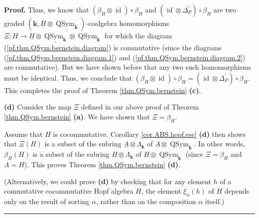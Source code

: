 \documentclass[numbers=enddot,12pt,final,onecolumn,notitlepage,abstracton]{scrartcl}%
\theoremstyle{definition}
\newenvironment{proof}[1][Proof]{\noindent\textbf{#1.} }{\ \rule{0.5em}{0.5em}}
\begin{document}
\begin{proof}
Thus, we know that $\left(  \beta_{H}\otimes\operatorname*{id}\right)
\circ\beta_{H}$ and $\left(  \operatorname*{id}\otimes\Delta_{P}^{\prime
}\right)  \circ\beta_{H}$ are two graded $\left(  \mathbf{k},\underline{H}%
\otimes\underline{\operatorname*{QSym}\nolimits_{\mathbf{k}}}\right)
$-coalgebra homomorphisms $\Xi:H\rightarrow\underline{H}\otimes
\underline{\operatorname*{QSym}\nolimits_{\mathbf{k}}}\otimes
\operatorname*{QSym}\nolimits_{\mathbf{k}}$ for which the diagram
(\ref{pf.thm.QSym.bernstein.diagram}) is commutative (since the diagrams
(\ref{pf.thm.QSym.bernstein.diagram.1}) and
(\ref{pf.thm.QSym.bernstein.diagram.2}) are commutative). But we have shown
before that any two such homomorphisms must be identical. Thus, we conclude
that $\left(  \beta_{H}\otimes\operatorname*{id}\right)  \circ\beta
_{H}=\left(  \operatorname*{id}\otimes\Delta_{P}^{\prime}\right)  \circ
\beta_{H}$. This completes the proof of Theorem \ref{thm.QSym.bernstein}
\textbf{(c)}.

\textbf{(d)} Consider the map $\Xi$ defined in our above proof of Theorem
\ref{thm.QSym.bernstein} \textbf{(a)}. We have shown that $\Xi=\beta_{H}$.

Assume that $H$ is cocommutative. Corollary \ref{cor.ABS.hopf.esc}
\textbf{(d)} then shows that $\Xi\left(  H\right)  $ is a subset of the
subring $\underline{A}\otimes\Lambda_{\mathbf{k}}$ of $\underline{A}%
\otimes\operatorname*{QSym}\nolimits_{\mathbf{k}}$. In other words, $\beta
_{H}\left(  H\right)  $ is a subset of the subring $\underline{H}%
\otimes\Lambda_{\mathbf{k}}$ of $\underline{H}\otimes\operatorname*{QSym}%
\nolimits_{\mathbf{k}}$ (since $\Xi=\beta_{H}$ and $A=H$). This proves Theorem
\ref{thm.QSym.bernstein} \textbf{(d)}.

(Alternatively, we could prove \textbf{(d)} by checking that for any element
$h$ of a commutative cocommutative Hopf algebra $H$, the element $\xi_{\alpha
}\left(  h\right)  $ of $H$ depends only on the result of sorting $\alpha$,
rather than on the composition $\alpha$ itself.)
\end{proof}
\end{document}
